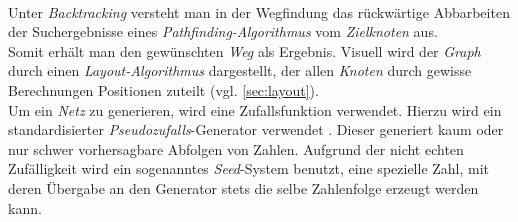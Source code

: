 \documentclass[12pt]{article}
\begin{document}
\\
Unter \textit{Backtracking} versteht man in der Wegfindung das rückwärtige Abbarbeiten der Suchergebnisse eines \textit{Pathfinding-Algorithmus} vom \textit{Zielknoten} aus. 
\\
Somit erhält man den gewünschten \textit{Weg} als Ergebnis. Visuell wird der \textit{Graph} durch einen \textit{Layout-Algorithmus} dargestellt, der allen \textit{Knoten} durch gewisse Berechnungen Positionen zuteilt (vgl. \autoref{sec:layout}).
\\
Um ein \textit{Netz} zu generieren, wird eine Zufallsfunktion verwendet. Hierzu wird ein standardisierter \textit{Pseudozufalls}-Generator verwendet \cite{random}. Dieser generiert kaum oder nur schwer vorhersagbare Abfolgen von Zahlen. Aufgrund der nicht echten Zufälligkeit wird ein sogenanntes \textit{Seed}-System benutzt, eine spezielle Zahl, mit deren Übergabe an den Generator stets die selbe Zahlenfolge erzeugt werden kann.
\end{document}
